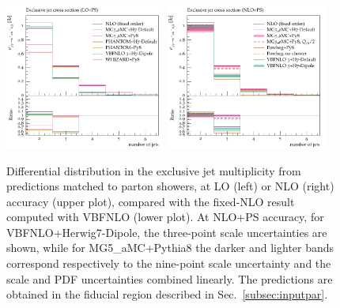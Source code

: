 \documentclass[twocolumn,epjc3]{svjour3} %
\newlength{\width}
\begin{document}
\begin{figure}
\centering
\includegraphics[width=0.47\textwidth]{figures/LOPS/jetsexclusive.pdf}
\includegraphics[width=0.47\textwidth]{figures/NLOPS/jetsexclusive.pdf}
\caption{Differential distribution in the
exclusive jet multiplicity
from predictions matched to parton showers, at LO (left) or NLO (right) accuracy (upper plot), compared with the fixed-NLO result computed with {\sc VBFNLO} (lower plot). At NLO+PS accuracy, for
    {\sc VBFNLO}+{\sc Herwig7-Dipole}, the three-point scale uncertainties are shown, while for {\sc MG5\_aMC}+{\sc Pythia8} the darker and lighter bands correspond
    respectively to the nine-point scale uncertainty and the scale and PDF uncertainties combined linearly.
    The predictions are obtained in the fiducial region described in Sec.~\protect\ref{subsec:inputpar}.}
\label{fig:PSnjet}
\end{figure}
\end{document}
